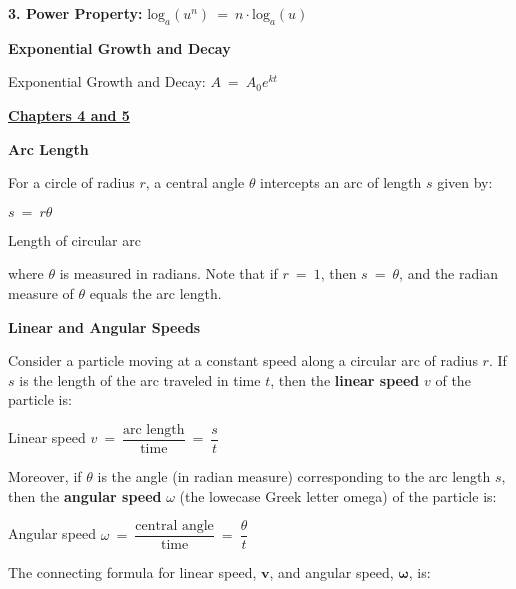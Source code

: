 \documentclass{article}
\begin{document}
\begin{large}
\hspace{0.2in} \textbf{3. Power Property:} $\text{log}_{a}\left(u^{n}\right)\ =\ n\cdot \text{log}_{a}(u)$

\textbf{Exponential Growth and Decay}

\hspace{0.1in} Exponential Growth and Decay: $A\ =\ A_{0}e^{kt}$

\vspace{0.25in}

\underline{\textbf{\huge Chapters 4 and 5 \phantom{ } \phantom{ } \phantom{ } \phantom{ }}}

\textbf{Arc Length}

\hspace{0.1in} For a circle of radius $r$, a central angle $\theta$ intercepts an arc of length $s$ given by:

\hspace{2.5in} $s\ =\ r\theta$ \begin{large} Length of circular arc\end{large}

\hspace{0.1in} where $\theta$ is measured in radians.  Note that if $r\ =\ 1$, then $s\ =\ \theta$, and the radian measure of $\theta$ equals the arc length.

\textbf{Linear and Angular Speeds}

\hspace{0.1in} Consider a particle moving at a constant speed along a circular arc of radius $r$.  If $s$ is the length of the arc traveled in time $t$, then the \textbf{linear speed} $v$ of the particle is:

\hspace{2.5in} Linear speed $v\ =\ \dfrac{\text{arc length}}{\text{time}}\ =\ \dfrac{s}{t}$

\hspace{0.1in} Moreover, if $\theta$ is the angle (in radian measure) corresponding to the arc length $s$, then the \textbf{angular speed} $\omega$ (the lowecase Greek letter omega) of the particle is:

\hspace{2.5in} Angular speed $\omega\ =\ \dfrac{\text{central angle}}{\text{time}}\ =\ \dfrac{\theta}{t}$

\hspace{0.1in} The connecting formula for linear speed, $\textbf{v}$, and angular speed, $\boldsymbol{\omega}$, is:

\vspace{-0.2in}


\end{large}
\end{document}
